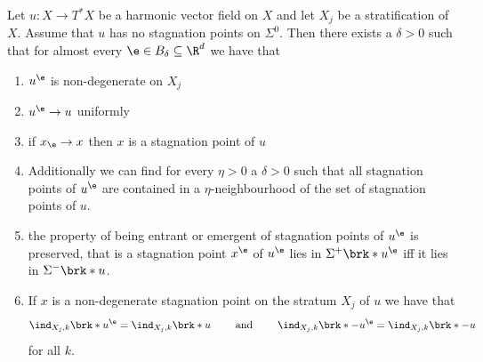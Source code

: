 \begin{corollary}\label{co:density_boundaryGeneric}
  Let $u\colon X\to T^*X$ be a harmonic vector field on $X$ and let $X_j$ be a stratification of $X$.
  Assume that $u$ has no stagnation points on $\Sigma^0$.
  Then there exists a $\delta>0$ such that for almost every $\e\in B_\delta\subseteq\R^d$ we have that
  \begin{enumerate}
    \item $u^\e$ is non-degenerate on $X_j$ \label{co:nonDegeneracy_density_nonDeg}
    \item $u^\e\to u$ uniformly
    \item if $x_\e\to x$ then $x$ is a stagnation point of $u$
    \item Additionally we can find for every $\eta>0$ a $\delta>0$ such that all stagnation points of $u^\e$ are contained in a 
    $\eta$-neighbourhood of the set of stagnation points of $u$.
    \item the property of being entrant or emergent of stagnation points of $u^\e$ is preserved, that is 
      a stagnation point $x^\e$ of $u^\e$ lies in $\Sigma^+\brk*{u^\e}$ iff it lies in $\Sigma^-\brk*{u}$.
    \item If $x$ is a non-degenerate stagnation point on the stratum $X_j$ of $u$ we have that
     \begin{align*}
        \ind_{X_j,k}\brk*{u^\e}=\ind_{X_j,k}\brk*{u}\qquad\text{ and }\qquad\ind_{X_j,k}\brk*{-u^\e}=\ind_{X_j,k}\brk*{-u}
      \end{align*}
      for all $k$.
  \end{enumerate}
\end{corollary}
